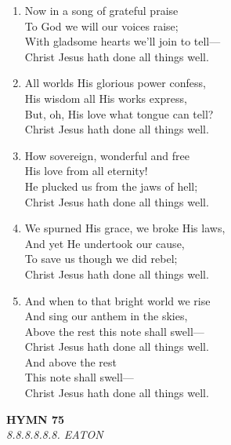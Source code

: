 \documentclass[11pt,a4paper]{article}
\begin{document}
\begin{enumerate}
    \item Now in a song of grateful praise \\
        To God we will our voices raise; \\
        With gladsome hearts we'll join to tell--- \\
        Christ Jesus hath done all things well.

    \item All worlds His glorious power confess, \\
        His wisdom all His works express, \\
        But, oh, His love what tongue can tell? \\
        Christ Jesus hath done all things well.

    \item How sovereign, wonderful and free \\
        His love from all eternity! \\
        He plucked us from the jaws of hell; \\
        Christ Jesus hath done all things well.

    \item We spurned His grace, we broke His laws, \\
        And yet He undertook our cause, \\
        To save us though we did rebel; \\
        Christ Jesus hath done all things well.

    \item And when to that bright world we rise \\
        And sing our anthem in the skies, \\
        Above the rest this note shall swell--- \\
        Christ Jesus hath done all things well. \\
        And above the rest \\
        This note shall swell--- \\
        Christ Jesus hath done all things well.

\end{enumerate}

\newpage
\begin{center}
    {\Large \textbf{HYMN 75}}
    \\
    \textit{8.8.8.8.8.8. EATON}
\end{center}
\vspace{1em}
\end{document}
